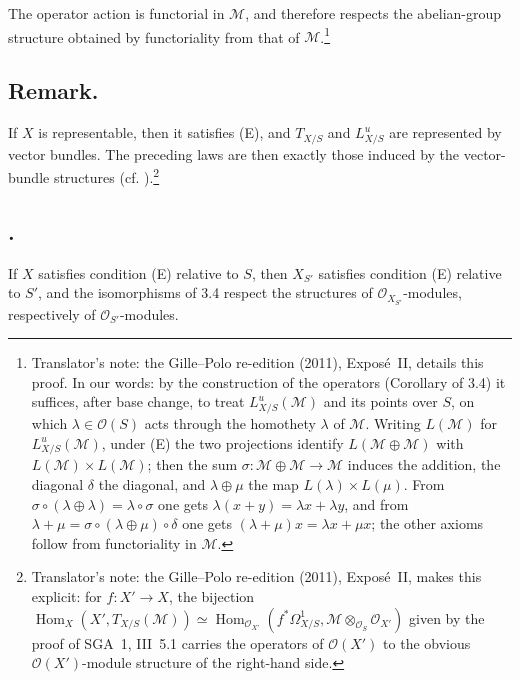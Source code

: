 The operator action is functorial in \(\mathcal M\), and therefore
respects the abelian-group structure obtained by functoriality from that
of \(\mathcal M\).\footnote{Translator's note: the Gille--Polo re-edition
(2011), Expos\'e~II, details this proof. In our words: by the construction
of the operators (Corollary of 3.4) it suffices, after base change, to treat
\(L^u_{X/S}(\mathcal M)\) and its points over \(S\), on which
\(\lambda\in\mathcal O(S)\) acts through the homothety \(\lambda\) of
\(\mathcal M\). Writing \(L(\mathcal M)\) for \(L^u_{X/S}(\mathcal M)\), under (E) the two
projections identify \(L(\mathcal M\oplus\mathcal M)\) with
\(L(\mathcal M)\times L(\mathcal M)\);
then the sum \(\sigma\colon\mathcal M\oplus\mathcal M\to\mathcal M\) induces
the addition, the diagonal \(\delta\) the diagonal, and
\(\lambda\oplus\mu\) the map \(L(\lambda)\times L(\mu)\). From
\(\sigma\circ(\lambda\oplus\lambda)=\lambda\circ\sigma\) one gets
\(\lambda(x+y)=\lambda x+\lambda y\), and from
\(\lambda+\mu=\sigma\circ(\lambda\oplus\mu)\circ\delta\) one gets
\((\lambda+\mu)x=\lambda x+\mu x\); the other axioms follow from
functoriality in \(\mathcal M\).}

\subsection*{Remark.}
If \(X\) is representable, then it satisfies (E), and \(T_{X/S}\) and
\(L^u_{X/S}\) are represented by vector bundles. The preceding laws
are then exactly those induced by the vector-bundle structures
(cf. ).\footnote{Translator's note: the Gille--Polo
re-edition (2011), Expos\'e~II, makes this explicit: for \(f\colon X'\to X\),
the bijection
\(\operatorname{Hom}_X(X',T_{X/S}(\mathcal M))\simeq
\operatorname{Hom}_{\mathcal O_{X'}}(f^*\Omega^1_{X/S},
\mathcal M\otimes_{\mathcal O_S}\mathcal O_{X'})\) given by the proof of
SGA~1, III~5.1 carries the operators of \(\mathcal O(X')\) to the obvious
\(\mathcal O(X')\)-module structure of the right-hand side.}

\subsection*{.}
If \(X\) satisfies condition (E) relative to \(S\), then \(X_{S'}\)
satisfies condition (E) relative to \(S'\), and the isomorphisms of 3.4
respect the structures of \(\mathcal O_{X_{S'}}\)-modules, respectively of
\(\mathcal O_{S'}\)-modules.

